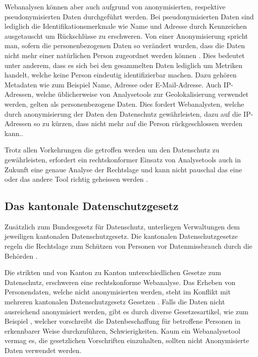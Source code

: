 Webanalysen können aber auch aufgrund von anonymisierten, respektive pseudonymisierten Daten durchgeführt werden. Bei pseudonymisierten Daten sind lediglich die Identifikationsmerkmale wie Name und Adresse durch Kennzeichen ausgetauscht um Rückschlüsse zu erschweren. Von einer Anonymisierung spricht man, sofern die personenbezogenen Daten so verändert wurden, dass die Daten nicht mehr einer natürlichen Person zugeordnet werden können \parencite[S. 3]{EcommerceUndDatenschutz}. Dies bedeutet unter anderem, dass es sich bei den gesammelten Daten lediglich um Metriken handelt, welche keine Person eindeutig identifizierbar machen. Dazu gehören Metadaten wie zum Beispiel Name, Adresse oder E-Mail-Adresse. Auch IP-Adressen, welche üblicherweise von Analysetools zur Geolokalisierung verwendet werden, gelten als personenbezogene Daten. Dies fordert Webanalysten, welche durch anonymisierung der Daten den Datenschutz gewährleisten, dazu auf die IP-Adressen so zu kürzen, dass nicht mehr auf die Person rückgeschlossen werden kann.\parencite[S. 4]{EcommerceUndDatenschutz}.

Trotz allen Vorkehrungen die getroffen werden um den Datenschutz zu gewährleisten, erfordert ein rechtskonformer Einsatz von Analysetools auch in Zukunft eine genaue Analyse der Rechtslage und kann nicht pauschal das eine oder das andere Tool richtig geheissen werden \parencite[S. 6]{EcommerceUndDatenschutz}.

\subsection{Das kantonale Datenschutzgesetz}
Zusätzlich zum Bundesgesetz für Datenschutz, unterliegen Verwaltungen dem jeweiligen kantonalen Datenschutzgesetz. Die kantonalen Datenschutzgesetze regeln die Rechtslage zum Schützen von Personen vor Datenmissbrauch durch die Behörden \parencite[Vgl. §§ 1 Abs. 1]{DSSGBERN}. 

Die strikten und von Kanton zu Kanton unterschiedlichen Gesetze zum Datenschutz, erschweren eine rechtskonforme Webanalyse. Das Erheben von Personendaten, welche nicht anonymisierten werden, steht im Konflikt mit mehreren kantonalen Datenschutzgesetz Gesetzen \parencite[Vgl. §§ 15 Abs. 1]{DSSGBERN}. Falls die Daten nicht ausreichend anonymisiert werden, gibt es durch diverse Gesetzesartikel, wie zum Beispiel \parencite[§§ 7 Abs. 1]{DSSGGL}, welcher vorschreibt die Datenbeschaffung für betroffene Personen in erkennbarer Weise durchzuführen, Schwierigkeiten. Kaum ein Webanalysetool vermag es, die gesetzlichen Vorschriften einzuhalten, sollten nicht Anonymisierte Daten verwendet werden.

